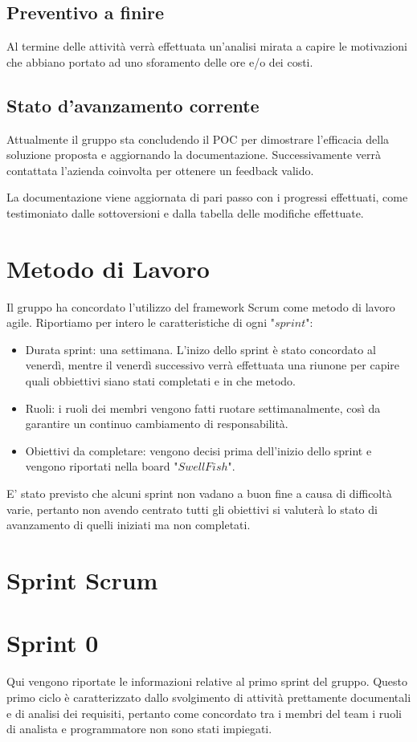\documentclass[12pt]{article}
\begin{document}
\subsection{Preventivo a finire}
Al termine delle attività verrà effettuata un'analisi mirata a capire le motivazioni che abbiano portato ad uno sforamento delle ore e/o dei costi.
\subsection{Stato d'avanzamento corrente}
Attualmente il gruppo sta concludendo il POC per dimostrare l'efficacia della soluzione proposta e aggiornando la documentazione. Successivamente verrà contattata l'azienda coinvolta per ottenere un feedback valido.

La documentazione viene aggiornata di pari passo con i progressi effettuati, come testimoniato dalle sottoversioni e dalla tabella delle modifiche effettuate.

\section{Metodo di Lavoro}
Il gruppo ha concordato l'utilizzo del framework Scrum come metodo di lavoro agile. 
Riportiamo per intero le caratteristiche di ogni "$sprint$": 
\begin{itemize}
    \item Durata sprint: una settimana. L'inizo dello sprint è stato concordato al venerdì, mentre il venerdì successivo verrà effettuata una riunone per capire quali obbiettivi siano stati completati e in che metodo.
    \item Ruoli: i ruoli dei membri vengono fatti ruotare settimanalmente, così da garantire un continuo cambiamento di responsabilità.
    \item Obiettivi da completare: vengono decisi prima dell'inizio dello sprint e vengono riportati nella board "$SwellFish$".
\end{itemize}
E' stato previsto che alcuni sprint non vadano a buon fine a causa di difficoltà varie, pertanto non avendo centrato tutti gli obiettivi si valuterà lo stato di avanzamento di quelli iniziati ma non completati.

\section{Sprint Scrum}
\section{Sprint 0}
Qui vengono riportate le informazioni relative al primo sprint del gruppo. Questo primo ciclo è caratterizzato dallo svolgimento di attività prettamente documentali e di analisi dei requisiti, pertanto come concordato tra i membri del team i ruoli di analista e programmatore non sono stati impiegati.
\end{document}
